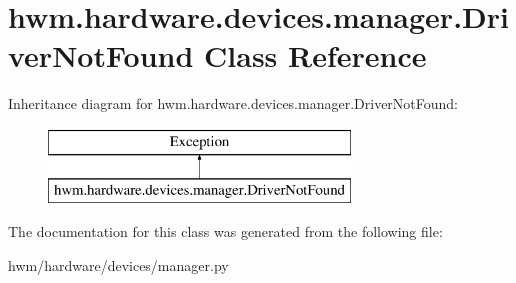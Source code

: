 \hypertarget{classhwm_1_1hardware_1_1devices_1_1manager_1_1_driver_not_found}{\section{hwm.\-hardware.\-devices.\-manager.\-Driver\-Not\-Found Class Reference}
\label{classhwm_1_1hardware_1_1devices_1_1manager_1_1_driver_not_found}
}
Inheritance diagram for hwm.\-hardware.\-devices.\-manager.\-Driver\-Not\-Found\-:\begin{figure}[H]
\begin{center}
\leavevmode
\includegraphics[height=2.000000cm]{classhwm_1_1hardware_1_1devices_1_1manager_1_1_driver_not_found}
\end{center}
\end{figure}


The documentation for this class was generated from the following file\-:\begin{DoxyCompactItemize}
\item 
hwm/hardware/devices/manager.\-py\end{DoxyCompactItemize}
